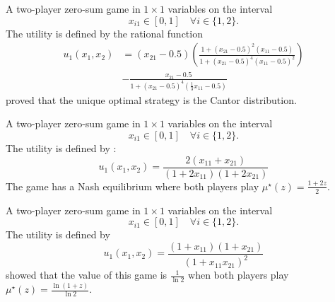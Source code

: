 \noindent
\begin{minipage}[c]{0.6\textwidth}
\begin{game}\label{ex.karlin59.vol2.sec71.ex2}
A two-player zero-sum game in $1 \times 1$ variables on the interval
$$x_{i1} \in [0,1] \quad \forall i \in \{1,2\}.$$
The utility is defined by the rational function
\begin{align*}
u_{1}\left( x_{1}, x_{2} \right) &=  \left( x_{21} - 0.5 \right)\left(\frac{1 + \left( x_{21} - 0.5 \right)^{2} \left( x_{11} - 0.5 \right)}{1 + \left( x_{21} - 0.5 \right)^{4} \left( x_{11} - 0.5 \right)^{2}} \right) \\
& - \frac{x_{21} - 0.5 }{1 + \left( x_{21} - 0.5 \right)^{4} \left( \frac{1}{3} x_{11} -0.5\right)}
\end{align*}
\textcite[Example~2]{karlin:chapter} proved that the unique optimal strategy is the Cantor distribution.
\end{game}
\strut
\end{minipage}
\hfill
\begin{minipage}[c]{0.35\textwidth}
\end{minipage}


\begin{game}\label{ex.karlin59.vol2.sec76.pr1}
A two-player zero-sum game in $1 \times 1$ variables on the interval
$$x_{i1} \in [0,1] \quad \forall i \in \{1,2\}.$$
The utility is defined by \cite[Problem 1]{karlin:chapter}:
\begin{equation*}
u_{1}\left( x_{1}, x_{2} \right) = \frac{2 \left( x_{11} + x_{21} \right)}{\left( 1 + 2 x_{11} \right) \left( 1 + 2 x_{21} \right)}
\end{equation*}
The game has a Nash equilibrium where both players play $\mu^\star(z)=\frac{1+2z}{2}$.
\end{game}


\begin{game}\label{ex.karlin59.vol2.sec76.pr2}
A two-player zero-sum game in $1 \times 1$ variables on the interval
$$x_{i1} \in [0,1] \quad \forall i \in \{1,2\}.$$
The utility is defined by
\begin{equation*}
u_{1}\left( x_{1}, x_{2} \right) = \frac{\left( 1 + x_{11} \right) \left( 1 + x_{21} \right)}{\left( 1 + x_{11} x_{21} \right)^{2}}
\end{equation*}
\textcite[Problem 2]{karlin:chapter} showed that the value of this game is $\frac{1}{\ln 2}$ when both players play $\mu^\star(z)=\frac{\ln (1+z)}{\ln 2}$.

\end{game}

